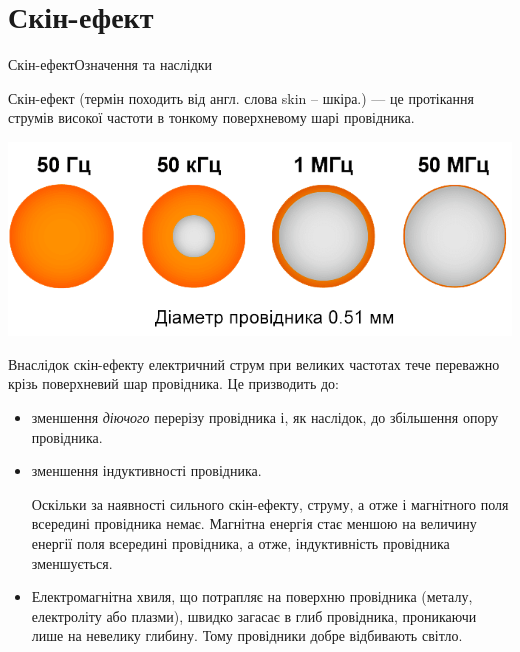 \documentclass[onlytextwidth]{beamer}
\begin{document}
\section{Скін-ефект}

\begin{frame}{Скін-ефект}{Означення та наслідки}
	\begin{block}{}\justifying
		Скін-ефект (термін походить від англ. слова skin -- шкіра.) --- це протікання струмів високої частоти в тонкому
		поверхневому шарі провідника.
	\end{block}
	\begin{center}
		\includegraphics[width=0.5\linewidth]{skin2}
	\end{center}
	\begin{block}{}\justifying\small
		Внаслідок скін-ефекту електричний струм при великих частотах тече переважно крізь поверхневий шар провідника. Це призводить до:
		\begin{itemize}\justifying
			\item зменшення  \emph{діючого} перерізу провідника і, як наслідок, до \alert{збільшення опору провідника}.
			\item зменшення  індуктивності провідника.

			      {\scriptsize Оскільки за наявності сильного скін-ефекту, струму, а отже і магнітного поля всередині
			      провідника немає. Магнітна енергія стає меншою на величину енергії поля всередині провідника, а отже,
			      \alert{індуктивність провідника
				      зменшується}.}

			\item Електромагнітна хвиля, що потрапляє на поверхню провідника (металу, електроліту або плазми),
			      швидко загасає в глиб провідника,
			      проникаючи лише на невелику глибину. Тому \alert{провідники добре відбивають світло}.
		\end{itemize}
	\end{block}
\end{frame}
\end{document}
